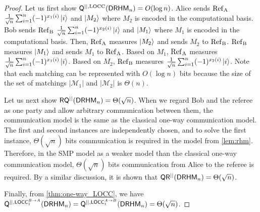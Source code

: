 \begin{proof}
    Let us first show $\mathsf{Q}^{||,\mathrm{LOCC}}(\mathsf{DRHM}_n) = O(\log n)$. Alice sends $\rm{Ref}_A$ $\frac{1}{\sqrt{n}} \sum_{i=1}^n (-1)^{x_{1}(i)} \ket{i}$ and $\ket{M_2}$ where $M_2$ is encoded in the computational basis. Bob sends $\rm{Ref}_B$ $\frac{1}{\sqrt{n}} \sum_{i=1}^n (-1)^{x_{2}(i)} \ket{i}$ and $\ket{M_1}$ where $M_1$ is encoded in the computational basis. Then, $\rm{Ref}_A$ measures $\ket{M_2}$ and sends $M_2$ to $\rm{Ref}_B$. $\rm{Ref}_B$ measures $\ket{M_1}$ and sends $M_1$ to $\rm{Ref}_A$. Based on $M_1$, $\rm{Ref}_A$ measures $\frac{1}{\sqrt{n}} \sum_{i=1}^n (-1)^{x_{1}(i)} \ket{i}$. Based on $M_2$, $\rm{Ref}_B$ measures $\frac{1}{\sqrt{n}} \sum_{i=1}^n (-1)^{x_{2}(i)} \ket{i}$. Note that each matching can be represented with $O(\log n)$ bits because the size of the set of matchings $|\mathcal{M}_1|$ and $|\mathcal{M}_2|$ is $\Theta(n)$.
    
    Let us next show $\mathsf{R}\mathsf{Q}^{||} (\mathsf{DRHM}_n) = \Theta(\sqrt{n})$. When we regard Bob and the referee as one party and allow arbitrary communication between them, the communication model is the same as the classical one-way communication model. The first and second instances are independently chosen, and to solve the first instance, $\Theta(\sqrt{n})$ bits communication is required in the model from \cref{lem:rhm}. Therefore, in the SMP model as a weaker model than the classical one-way communication model, $\Theta(\sqrt{n})$ bits communication from Alice to the referee is required. By a similar discussion, it is shown that $\mathsf{Q}\mathsf{R}^{||} (\mathsf{DRHM}_n) = \Theta(\sqrt{n})$.

    Finally, from \cref{thm:one-way_LOCC}, we have $\mathsf{Q}^{||,\mathsf{LOCC}_1^{B \rightarrow A}}(\mathsf{DRHM}_n) = \mathsf{Q}^{||,\mathsf{LOCC}_1^{A \rightarrow B}}(\mathsf{DRHM}_n) = \Theta(\sqrt{n})$.
\end{proof}

